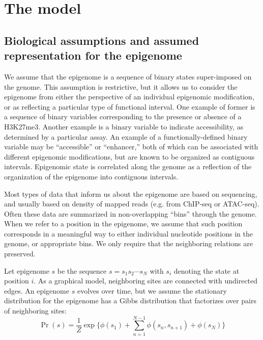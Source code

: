 \documentclass[11pt]{article}
\begin{document}
\section{The model}

\subsection{Biological assumptions and assumed representation for the epigenome}
\label{biodefs}

We assume that the epigenome is a sequence of binary states
super-imposed on the genome. This assumption is restrictive, but it
allows us to consider the epigenome from either the perspective of an
individual epigenomic modification, or as reflecting a particular type
of functional interval. One example of former is a sequence of binary
variables corresponding to the presence or absence of a H3K27me3.
Another example is a binary variable to indicate accessibility, as
determined by a particular assay. An example of a functionally-defined
binary variable may be ``accessible'' or ``enhancer,'' both of which
can be associated with different epigenomic modifications, but are
known to be organized as contiguous intervals. Epigenomic state is
correlated along the genome as a reflection of the organization of the
epigenome into contiguous intervals.

Most types of data that inform us about the epigenome are based on
sequencing, and usually based on density of mapped reads (e.g. from
ChIP-seq or ATAC-seq). Often these data are summarized in
non-overlapping ``bins'' through the genome. When we refer to a
position in the epigenome, we assume that such position corresponds in
a meaningful way to either individual nucleotide positions
in the genome, or appropriate bins. We only require that the
neighboring relations are preserved.

Let epigenome $s$ be the sequence $s=s_1s_2\cdots s_N$ with $s_i$
denoting the state at position $i$.
As a graphical model, neighboring sites are connected with undirected
edges. An epigenome $s$ evolves over time, but we assume the
stationary distribution for the epigenome has a Gibbs distribution
that factorizes over pairs of neighboring sites:
\begin{equation}\label{eqn:stationary}
  \Pr(s) = \frac{1}{Z} \exp\big\{\phi(s_1) +\sum_{n=1}^{N-1}\phi(s_n, s_{n+1}) + \phi(s_N)\big\}
\end{equation}
\end{document}

